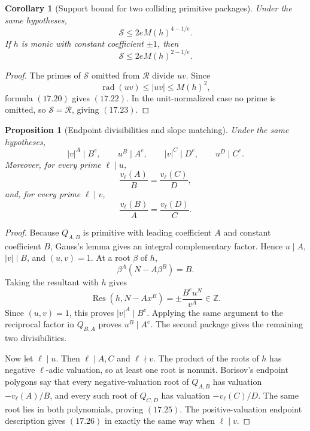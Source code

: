 \documentclass[11pt]{article}
\newtheorem{proposition}[theorem]{Proposition}
\newtheorem{corollary}[theorem]{Corollary}
\theoremstyle{definition}
\newcommand{\Z}{\mathbb Z}
\newcommand{\Res}{\operatorname{Res}}
\begin{document}
\begin{corollary}[Support bound for two colliding primitive packages]
\label{cor:supportbound}
Under the same hypotheses,
\begin{equation}
 \mathcal S\leq2eM(h)^{4-1/e}.
 \tag{17.22}
\end{equation}
If \(h\) is monic with constant coefficient \(\pm1\), then
\begin{equation}
 \mathcal S\leq2eM(h)^{2-1/e}.
 \tag{17.23}
\end{equation}
\end{corollary}

\begin{proof}
The primes of \(\mathcal S\) omitted from \(\mathcal R\) divide \(uv\).
Since
\[
 \operatorname{rad}(uv)\leq|uv|\leq M(h)^2,
\]
formula \((17.20)\) gives \((17.22)\).  In the unit-normalized case no prime
is omitted, so \(\mathcal S=\mathcal R\), giving \((17.23)\).
\end{proof}

\begin{proposition}[Endpoint divisibilities and slope matching]
\label{prop:endpointarith}
Under the same hypotheses,
\begin{equation}
 |v|^A\mid B^e,
 \qquad u^B\mid A^e,
 \qquad |v|^C\mid D^e,
 \qquad u^D\mid C^e.
 \tag{17.24}
\end{equation}
Moreover, for every prime \(\ell\mid u\),
\begin{equation}
 \frac{v_\ell(A)}B=\frac{v_\ell(C)}D,
 \tag{17.25}
\end{equation}
and, for every prime \(\ell\mid v\),
\begin{equation}
 \frac{v_\ell(B)}A=\frac{v_\ell(D)}C.
 \tag{17.26}
\end{equation}
\end{proposition}

\begin{proof}
Because \(Q_{A,B}\) is primitive with leading coefficient \(A\) and
constant coefficient \(B\), Gauss's lemma gives an integral complementary
factor.  Hence \(u\mid A\), \(|v|\mid B\), and \((u,v)=1\).
At a root \(\beta\) of \(h\),
\[
 \beta^A(N-A\beta^B)=B.
\]
Taking the resultant with \(h\) gives
\begin{equation}
 \Res(h,N-Ax^B)
 =\pm\frac{B^eu^N}{v^A}\in\Z.
 \tag{17.27}
\end{equation}
Since \((u,v)=1\), this proves \(|v|^A\mid B^e\).  Applying the same
argument to the reciprocal factor in \(Q_{B,A}\) proves
\(u^B\mid A^e\).  The second package gives the remaining two divisibilities.

Now let \(\ell\mid u\).  Then \(\ell\mid A,C\) and \(\ell\nmid v\).
The product of the roots of \(h\) has negative \(\ell\)-adic valuation, so
at least one root is nonunit.  Borisov's endpoint polygons say that every
negative-valuation root of \(Q_{A,B}\) has valuation
\(-v_\ell(A)/B\), and every such root of \(Q_{C,D}\) has valuation
\(-v_\ell(C)/D\).  The same root lies in both polynomials, proving
\((17.25)\).  The positive-valuation endpoint description gives
\((17.26)\) in exactly the same way when \(\ell\mid v\).
\end{proof}
\end{document}
